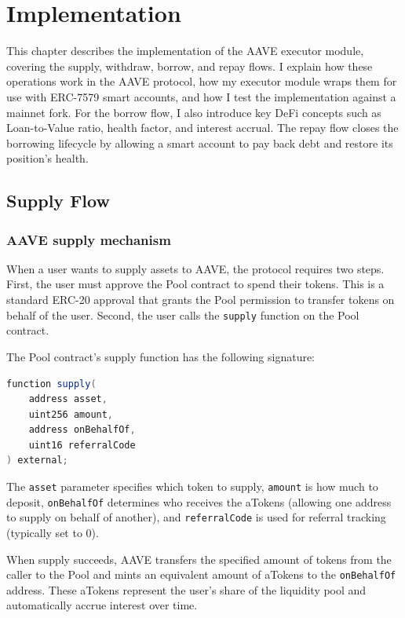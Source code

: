 \chapter{Implementation}
\label{chap:implementation}

This chapter describes the implementation of the AAVE executor module, covering the supply, withdraw, borrow, and repay flows. I explain how these operations work in the AAVE protocol, how my executor module wraps them for use with ERC-7579 smart accounts, and how I test the implementation against a mainnet fork. For the borrow flow, I also introduce key DeFi concepts such as Loan-to-Value ratio, health factor, and interest accrual. The repay flow closes the borrowing lifecycle by allowing a smart account to pay back debt and restore its position's health.

\section{Supply Flow}

\subsection{AAVE supply mechanism}

When a user wants to supply assets to AAVE, the protocol requires two steps. First, the user must approve the Pool contract to spend their tokens. This is a standard ERC-20 approval that grants the Pool permission to transfer tokens on behalf of the user. Second, the user calls the \texttt{supply} function on the Pool contract.

The Pool contract's supply function has the following signature:

\begin{lstlisting}[language=Java,caption={AAVE Pool supply function},label=lst:pool-supply]
function supply(
    address asset,
    uint256 amount,
    address onBehalfOf,
    uint16 referralCode
) external;
\end{lstlisting}

The \texttt{asset} parameter specifies which token to supply, \texttt{amount} is how much to deposit, \texttt{onBehalfOf} determines who receives the aTokens (allowing one address to supply on behalf of another), and \texttt{referralCode} is used for referral tracking (typically set to 0).

When supply succeeds, AAVE transfers the specified amount of tokens from the caller to the Pool and mints an equivalent amount of aTokens to the \texttt{onBehalfOf} address. These aTokens represent the user's share of the liquidity pool and automatically accrue interest over time.


